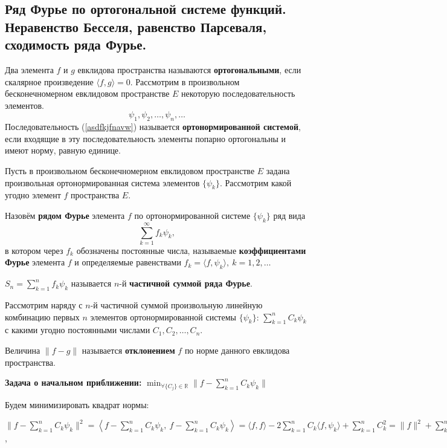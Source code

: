 \subsection{Ряд Фурье по ортогональной системе функций. Неравенство Бесселя, равенство Парсеваля,  сходимость ряда Фурье.}

Два элемента $f$ и $g$ евклидова пространства называются \textbf{ортогональными}, если скалярное произведение $\langle f, g \rangle = 0$.
Рассмотрим в произвольном бесконечномерном евклидовом пространстве $E$ некоторую последовательность элементов.
\begin{equation}
    \psi_1, \psi_2, \dots, \psi_n, \dots
    \label{asdfkjfnavw}
\end{equation}
Последовательность (\ref{asdfkjfnavw}) называется \textbf{ортонормированной системой}, если входящие в эту последовательность элементы попарно ортогональны и имеют норму, равную единице.

Пусть в произвольном бесконечномерном евклидовом пространстве $E$ задана произвольная ортонормированная система элементов $\{\psi_k\}$. Рассмотрим какой угодно элемент $f$ пространства $E$.

Назовём \textbf{рядом Фурье} элемента $f$ по ортонормированной системе $\{\psi_k\}$ ряд вида
$$\displaystyle\sum_{k=1}^{\infty} f_k\psi_k,$$
в котором через $f_k$ обозначены постоянные числа, называемые \textbf{коэффициентами Фурье} элемента $f$ и определяемые равенствами $f_k =\langle f,\psi_k\rangle, ~ k=1,2,\dots$

$S_n =\displaystyle\sum_{k=1}^{n}f_k\psi_k$ называется $n$-й \textbf{частичной суммой ряда Фурье}.

Рассмотрим наряду с $n$-й частичной суммой произвольную линейную комбинацию первых $n$ элементов ортонормированной системы $\{\psi_k\}$: $\displaystyle\sum_{k=1}^{n}C_k\psi_k$ с какими угодно постоянными числами $C_1, C_2, \dots, C_n$.

Величина $ \| f-g \|$ называется \textbf{отклонением} $f$ по норме данного евклидова пространства.

\textbf{Задача о начальном приближении:} $\displaystyle\min_{\forall\{C_j\}\in\mathbb{R}}  \|f-\displaystyle\sum_{k=1}^{n}C_k\psi_k \|$

Будем минимизировать квадрат нормы:

$ \| f-\displaystyle\sum_{k=1}^{n}C_k\psi_k \|^2 =  
\left\langle f-\displaystyle\sum_{k=1}^{n}C_k\psi_k, ~ f-\displaystyle\sum_{k=1}^{n}C_k\psi_k \right\rangle = 
\langle f, f \rangle - 2\displaystyle\sum_{k=1}^{n}C_k\langle f, \psi_k \rangle + \displaystyle\sum_{k=1}^{n} C_k^2 = 
\| f\|^2 + \displaystyle\sum_{k=1}^{n}(C_k^2-2C_kf_k) = 
\left\{ \pm \displaystyle\sum_{k=1}^{n}f_k^2 \right\} = 
\| f\|^2 - \displaystyle\sum_{k=1}^{n}f_k^2 + \displaystyle\sum_{k=1}^{n}(C_k-f_k)^2$,

